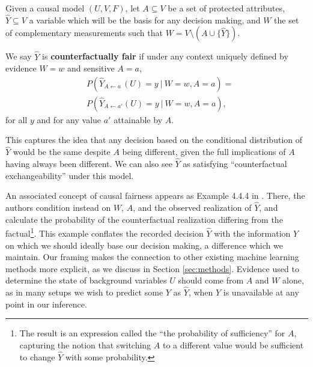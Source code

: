 Given a causal model $(U, V, F)$, let $A\subseteq V$ be a set of protected
attributes, $\hat Y \subseteq V$ a variable which will be the basis for
any decision making, and $W$ the set of complementary measurements such that
$W= V \setminus ( A \cup \{\hat Y\})$.
\begin{define}
We say $\hat Y$ is {\bf counterfactually fair}
if under any context uniquely defined by evidence $W = w$ and sensitive $A = a$,
  \label{eq:cf_definition}
\begin{align}
  &P(\hat Y_{A \leftarrow a\ }(U) = y\ |\ W = w, A = a)  =\nonumber\\ 
  &P(\hat Y_{A \leftarrow a'}(U) = y\ |\ W = w, A = a), 
\end{align}
for all $y$ and for any value $a'$ attainable by $A$.
\end{define}
This captures the idea that any decision based on the
conditional distribution of $\hat Y$ would be the same despite  $A$ being
different, given the full implications of $A$ having always been different.
We can also see $\hat Y$ as satisfying ``counterfactual exchangeability''
under this model.

An associated concept of causal fairness appears as Example 4.4.4 in
\citet{pearl:16}. There, the authors condition instead on $W$, $A$,
and the observed realization of $\hat Y$, and calculate the
probability of the counterfactual realization differing from the
factual\footnote{The result is an expression called the ``the
  probability of sufficiency'' for $A$, capturing the notion that
  switching $A$ to a different value would be sufficient to change
  $\hat Y$ with some probability.}. This example conflates the
recorded decision $\hat Y$ with the information $Y$ on which we should
ideally base our decision making, a difference which we maintain.  Our
framing makes the connection to other existing machine learning
methods more explicit, as we discuss in Section \ref{sec:methods}.
Evidence used to determine the state of background variables $U$
should come from $A$ and $W$ alone, as in many setups we wish to
predict some $Y$ as $\hat Y$, when $Y$ is unavailable at any point in
our inference.

